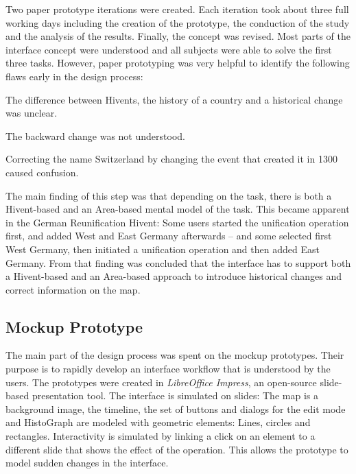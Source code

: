 Two paper prototype iterations were created. Each iteration took about three full working days including the creation of the prototype, the conduction of the study and the analysis of the results. Finally, the concept was revised.
Most parts of the interface concept were understood and all subjects were able to solve the first three tasks. However, paper prototyping was very helpful to identify the following flaws early in the design process:

\begin{compactenum}
  \item The difference between Hivents, the history of a country and a historical change was unclear.
  \item The backward change was not understood.
  \item Correcting the name Switzerland by changing the event that created it in 1300 caused confusion.
\end{compactenum}

The main finding of this step was that depending on the task, there is both a Hivent-based and an Area-based mental model of the task. This became apparent in the German Reunification Hivent: Some users started the unification operation first, and added West and East Germany afterwards -- and some selected first West Germany, then initiated a unification operation and then added East Germany. From that finding was concluded that the interface has to support both a Hivent-based and an Area-based approach to introduce historical changes and correct information on the map.


\subsection{Mockup Prototype} %
\label{sub:mockup_prototype}

The main part of the design process was spent on the mockup prototypes. Their purpose is to rapidly develop an interface workflow that is understood by the users. The prototypes were created in \emph{LibreOffice Impress}, an open-source slide-based presentation tool. The interface is simulated on slides: The map is a background image, the timeline, the set of buttons and dialogs for the edit mode and HistoGraph are modeled with geometric elements: Lines, circles and rectangles. Interactivity is simulated by linking a click on an element to a different slide that shows the effect of the operation. This allows the prototype to model sudden changes in the interface.

